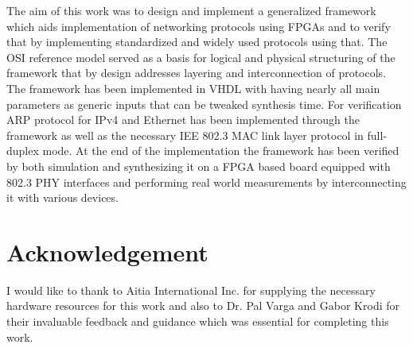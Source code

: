 \documentclass[conference]{IEEEtran}
\begin{document}
The aim of this work was to design and implement a generalized framework which aids implementation of networking protocols using FPGAs and to verify that by implementing standardized and widely used protocols using that. The OSI reference model served as a basis for logical and physical structuring of the framework that by design addresses layering and interconnection of protocols. The framework has been implemented in VHDL with having nearly all main parameters as generic inputs that can be tweaked synthesis time. For verification ARP protocol for IPv4 and Ethernet has been implemented through the framework as well as the necessary IEE 802.3 MAC link layer protocol in full-duplex mode.
At the end of the implementation the framework has been verified by both simulation and synthesizing it on a FPGA based board equipped with 802.3 PHY interfaces and performing real world measurements by interconnecting it with various devices. \cite{Williams_Web_Workload_Characterization_10_Years}

\section{Acknowledgement}
I would like to thank to Aitia International Inc. for supplying the necessary hardware resources for this work and also to Dr. Pal Varga and Gabor Krodi for their invaluable feedback and guidance which was essential for completing this work.





%

%
%
\end{document}
